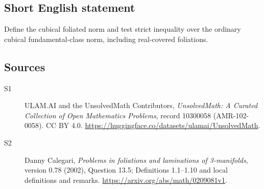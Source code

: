 \documentclass[11pt]{article}
\begin{document}
\subsection{Short English statement}
Define the cubical foliated norm and test strict inequality over the ordinary cubical fundamental-class norm, including real-covered foliations.
\subsection{Sources}
\begin{description}
\item[\hypertarget{source:10300058:1}{S1}] ULAM.AI and the UnsolvedMath Contributors, \emph{UnsolvedMath: A Curated Collection of Open Mathematics Problems}, record 10300058 (AMR-102-0058). CC BY 4.0. \url{https://huggingface.co/datasets/ulamai/UnsolvedMath}.
\item[\hypertarget{source:10300058:2}{S2}] Danny Calegari, \emph{Problems in foliations and laminations of 3-manifolds}, version 0.78 (2002), Question 13.5; Definitions 1.1--1.10 and local definitions and remarks. \url{https://arxiv.org/abs/math/0209081v1}.
\end{description}
\label{end:10300058}
\end{document}
